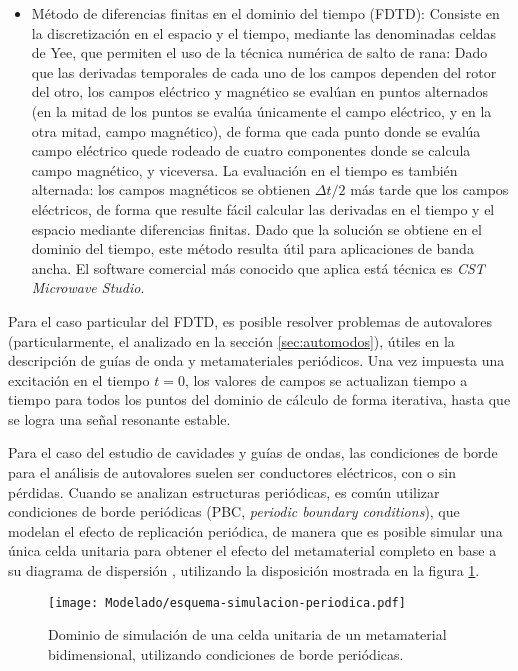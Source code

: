 \begin{itemize}
	\item Método de diferencias finitas en el dominio del tiempo (FDTD): Consiste en la discretización en el espacio y el tiempo, mediante las denominadas celdas de Yee, que permiten el uso de la técnica numérica de salto de rana: Dado que las derivadas temporales de cada uno de los campos dependen del rotor del otro, los campos eléctrico y magnético se evalúan en puntos alternados (en la mitad de los puntos se evalúa únicamente el campo eléctrico, y en la otra mitad, campo magnético), de forma que cada punto donde se evalúa campo eléctrico quede rodeado de cuatro componentes donde se calcula campo magnético, y viceversa. La evaluación en el tiempo es también alternada: los campos magnéticos se obtienen $\Delta t/2$ más tarde que los campos eléctricos, de forma que resulte fácil calcular las derivadas en el tiempo y el espacio mediante diferencias finitas. Dado que la solución se obtiene en el dominio del tiempo, este método resulta útil para aplicaciones de banda ancha. El software comercial más conocido que aplica está técnica es \textit{CST Microwave Studio}.
\end{itemize}

Para el caso particular del FDTD, es posible resolver problemas de autovalores (particularmente, el analizado en la sección \ref{sec:automodos}), útiles en la descripción de guías de onda y metamateriales periódicos. Una vez impuesta una excitación en el tiempo $t=0$, los valores de campos se actualizan tiempo a tiempo para todos los puntos del dominio de cálculo de forma iterativa, hasta que se logra una señal resonante estable.

Para el caso del estudio de cavidades y guías de ondas, las condiciones de borde para el análisis de autovalores suelen ser conductores eléctricos, con o sin pérdidas. Cuando se analizan estructuras periódicas, es común utilizar condiciones de borde periódicas (PBC, \textit{periodic boundary conditions}), que modelan el efecto de replicación periódica, de manera que es posible simular una única celda unitaria para obtener el efecto del metamaterial completo en base a su diagrama de dispersión \cite{Yang:EBGAntennas}, utilizando la disposición mostrada en la figura \ref{fig:esquema-simulacion-periodica}.

\begin{figure}[h]
	\centering
	\texttt{[image: Modelado/esquema-simulacion-periodica.pdf]}
	\caption{Dominio de simulación de una celda unitaria de un metamaterial bidimensional, utilizando condiciones de borde periódicas.}
	\label{fig:esquema-simulacion-periodica}
\end{figure}

